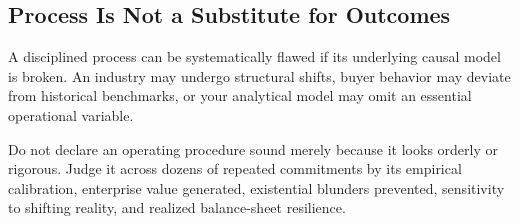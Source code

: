 \subsection{Process Is Not a Substitute for Outcomes}

A disciplined process can be systematically flawed if its underlying causal model is broken. An industry may undergo structural shifts, buyer behavior may deviate from historical benchmarks, or your analytical model may omit an essential operational variable.

Do not declare an operating procedure sound merely because it looks orderly or rigorous. Judge it across dozens of repeated commitments by its empirical calibration, enterprise value generated, existential blunders prevented, sensitivity to shifting reality, and realized balance-sheet resilience.
